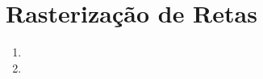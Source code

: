 \section*{Rasterização de Retas}

	\begin{enumerate}\addtocounter{enumi}{5}
		\item 
		
		\item 
	\end{enumerate}


\newpage